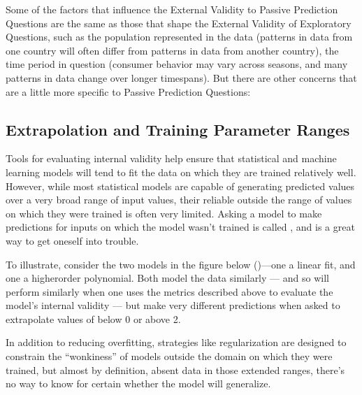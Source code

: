 \documentclass[letterpaper,10pt,english]{jupyterBook}
\begin{document}
\sphinxAtStartPar
Some of the factors that influence the External Validity to Passive Prediction Questions are the same as those that shape the External Validity of Exploratory Questions, such as the population represented in the data (patterns in data from one country will often differ from patterns in data from another country), the time period in question (consumer behavior may vary across seasons, and many patterns in data change over longer timespans). But there are other concerns that are a little more specific to Passive Prediction Questions:


\subsection{Extrapolation and Training Parameter Ranges}
\label{\detokenize{30_questions/24_passive_prediction_external:extrapolation-and-training-parameter-ranges}}
\sphinxAtStartPar
Tools for evaluating internal validity help ensure that statistical and machine learning models will tend to fit the data on which they are trained relatively well. However, while most statistical models are capable of generating predicted values over a very broad range of input values, their reliable outside the range of values on which they were trained is often very limited. Asking a model to make predictions for inputs on which the model wasn’t trained is called , and is a great way to get oneself into trouble.

\sphinxAtStartPar
To illustrate, consider the two models in the figure below ()—one a linear fit, and one a higher\sphinxhyphen{}order polynomial. Both model the data similarly  — and so will perform similarly when one uses the metrics described above to evaluate the model’s internal validity — but make very different predictions when asked to extrapolate values of  below 0 or above 2.

\sphinxAtStartPar
{}

\sphinxAtStartPar
In addition to reducing overfitting, strategies like regularization are designed to constrain the “wonkiness” of models outside the domain on which they were trained, but almost by definition, absent data in those extended ranges, there’s no way to know for certain whether the model will generalize.
\end{document}

